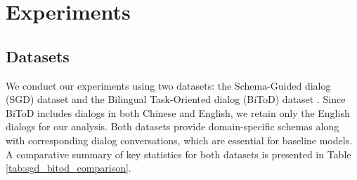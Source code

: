 \section{Experiments}




\subsection{Datasets}
We conduct our experiments using two datasets: the Schema-Guided dialog (SGD) dataset \cite{rastogi2020towards} and the Bilingual Task-Oriented dialog (BiToD) dataset \cite{lin2021bitod}. Since BiToD includes dialogs in both Chinese and English, we retain only the English dialogs for our analysis. Both datasets provide domain-specific schemas along with corresponding dialog conversations, which are essential for baseline models. A comparative summary of key statistics for both datasets is presented in Table \ref{tab:sgd_bitod_comparison}.


